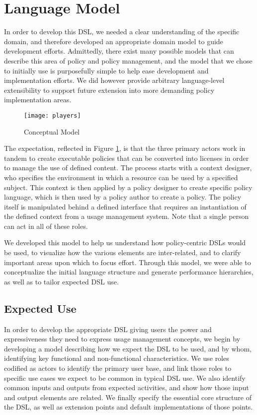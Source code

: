 \section{Language Model}\label{sec:model}
In order to develop this DSL, we needed a clear understanding of the specific domain, and therefore developed an appropriate domain model to guide development efforts.  Admittedly, there exist many possible models that can describe this area of policy and policy management, and the model that we chose to initially use is purposefully simple to help ease development and implementation efforts.  We did however provide arbitrary language-level extensibility to support future extension into more demanding policy implementation areas.

\begin{figure}[!t]
\centering
\texttt{[image: players]}
\caption{Conceptual Model}
\label{fig:model:conceptual-model}
\end{figure}

The expectation, reflected in Figure \ref{fig:model:conceptual-model}, is that the three primary actors work in tandem to create executable policies that can be converted into licenses in order to manage the use of defined content.  The process starts with a context designer, who specifies the environment in which a resource can be used by a specified subject.  This context is then applied by a policy designer to create specific policy language, which is then used by a policy author to create a policy.  The policy itself is manipulated behind a defined interface that requires an instantiation of the defined context from a usage management system.  Note that a single person can act in all of these roles.

We developed this model to help us understand how policy-centric DSLs would be used, to visualize how the various elements are inter-related, and to clarify important areas upon which to focus effort.  Through this model, we were able to conceptualize the initial language structure and generate performance hierarchies, as well as to tailor expected DSL use.

\subsection{Expected Use}
In order to develop the appropriate DSL giving users the power and expressiveness they need to express usage management concepts, we begin by developing a model describing how we expect the DSL to be used, and by whom, identifying key functional and non-functional characteristics.  We use roles codified as actors to identify the primary user base, and link those roles to specific use cases we expect to be common in typical DSL use.  We also identify common inputs and outputs from expected activities, and show how those input and output elements are related.  We finally specify the essential core structure of the DSL, as well as extension points and default implementations of those points.

